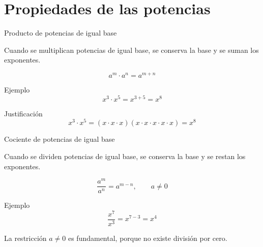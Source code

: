 \documentclass[handout,aspectratio=169]{beamer}
\begin{document}
	\section{Propiedades de las potencias}
	
	\begin{frame}{Producto de potencias de igual base}
		\begin{idea}
			Cuando se multiplican potencias de igual base, se conserva la base y se suman los exponentes.
		\end{idea}
		
		\[
		a^m\cdot a^n = a^{m+n}
		\]
		
		\pause
		
		\begin{exampleblock}{Ejemplo}
			\[
			x^3\cdot x^5 = x^{3+5}=x^8
			\]
		\end{exampleblock}
		
		\pause
		
		\begin{block}{Justificación}
			\[
			x^3\cdot x^5
			=
			(x\cdot x\cdot x)(x\cdot x\cdot x\cdot x\cdot x)
			=
			x^8
			\]
		\end{block}
	\end{frame}
	
	\begin{frame}{Cociente de potencias de igual base}
		\begin{idea}
			Cuando se dividen potencias de igual base, se conserva la base y se restan los exponentes.
		\end{idea}
		
		\[
		\frac{a^m}{a^n}=a^{m-n},
		\qquad a\neq 0
		\]
		
		\pause
		
		\begin{exampleblock}{Ejemplo}
			\[
			\frac{x^7}{x^3}=x^{7-3}=x^4
			\]
		\end{exampleblock}
		
		\pause
		
		\begin{alerta}
			La restricción \(a\neq 0\) es fundamental, porque no existe división por cero.
		\end{alerta}
	\end{frame}
	
\end{document}
